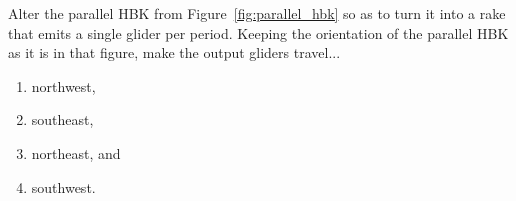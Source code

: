 \begin{multicols}{2}
\mfilbreak


\begin{problem}\label{exer:parallel_hbk_rake}
	Alter the parallel HBK from Figure~\ref{fig:parallel_hbk} so as to turn it into a rake that emits a single glider per period. Keeping the orientation of the parallel HBK as it is in that figure, make the output gliders travel...\smallskip
	
	\begin{enumerate}[label=\bf\color{ocre}(\alph*)]
		\item {} northwest,
		
		\item {} southeast,
		
		\item {} northeast, and
		
		\item {} southwest.
		
	\end{enumerate}
\end{problem}


\end{multicols}
\normalsize\vspace*{0.01cm}
